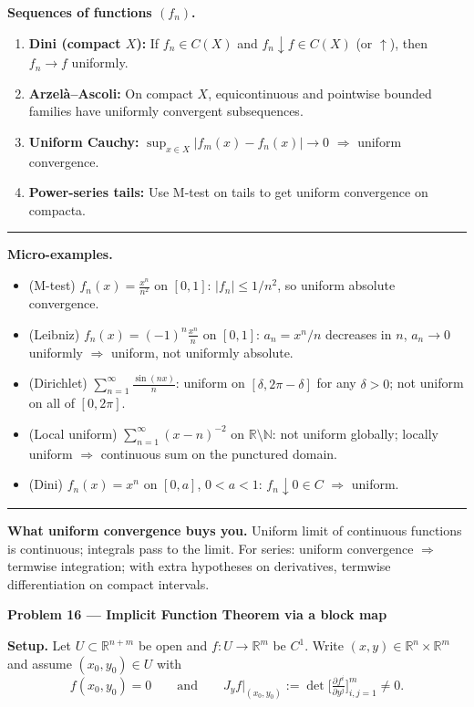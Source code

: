 \documentclass[12pt,a4paper]{article}
\theoremstyle{plain}
\theoremstyle{definition}
\theoremstyle{remark}
\theoremstyle{remark}
\newcommand{\probheader}[1]{%
	\par\vspace{8pt}%
	{\Large\bfseries #1\par}%
	\vspace{6pt}%
}
\newcommand{\sep}{\vspace{6pt}\hrule\vspace{8pt}}
\begin{document}
	\textbf{Sequences of functions $(f_n)$.}
	\begin{enumerate}[leftmargin=1.2cm,label=\arabic*)]
		\item \textbf{Dini (compact $X$):} If $f_n\in C(X)$ and $f_n\downarrow f\in C(X)$ (or $\uparrow$), then $f_n\to f$ uniformly.
		\item \textbf{Arzel\`a--Ascoli:} On compact $X$, equicontinuous and pointwise bounded families have uniformly convergent subsequences.
		\item \textbf{Uniform Cauchy:} $\sup_{x\in X}|f_m(x)-f_n(x)|\to0$ $\Rightarrow$ uniform convergence.
		\item \textbf{Power-series tails:} Use M-test on tails to get uniform convergence on compacta.
	\end{enumerate}
	
	\sep
	
	\textbf{Micro-examples.}
	\begin{itemize}
		\item (M-test) $\displaystyle f_n(x)=\frac{x^n}{n^2}$ on $[0,1]$:
		$|f_n|\le 1/n^2$, so uniform absolute convergence.
		\item (Leibniz) $\displaystyle f_n(x)=(-1)^n\frac{x^n}{n}$ on $[0,1]$:
		$a_n=x^n/n$ decreases in $n$, $a_n\to0$ uniformly $\Rightarrow$ uniform, not uniformly absolute.
		\item (Dirichlet) $\displaystyle \sum_{n=1}^\infty \frac{\sin(nx)}{n}$:
		uniform on $[\delta,2\pi-\delta]$ for any $\delta>0$; not uniform on all of $[0,2\pi]$.
		\item (Local uniform) $\displaystyle \sum_{n=1}^\infty (x-n)^{-2}$ on $\mathbb R\setminus\mathbb N$:
		not uniform globally; locally uniform $\Rightarrow$ continuous sum on the punctured domain.
		\item (Dini) $f_n(x)=x^n$ on $[0,a]$, $0<a<1$: $f_n\downarrow 0\in C$ $\Rightarrow$ uniform.
	\end{itemize}
	
	\sep
	
	\textbf{What uniform convergence buys you.}
	Uniform limit of continuous functions is continuous; integrals pass to the limit.
	For series: uniform convergence $\Rightarrow$ termwise integration; with extra hypotheses on derivatives,
	termwise differentiation on compact intervals.
	
	\probheader{Problem 16 — Implicit Function Theorem via a block map}
	
	\textbf{Setup.}
	Let $U\subset\mathbb{R}^{n+m}$ be open and $f:U\to\mathbb{R}^m$ be $C^1$.
	Write $(x,y)\in\mathbb{R}^n\times\mathbb{R}^m$ and assume $(x_0,y_0)\in U$ with
	\[
	f(x_0,y_0)=0
	\qquad\text{and}\qquad
	J_y f\big|_{(x_0,y_0)}:=\det\!\Big[\tfrac{\partial f^i}{\partial y^j}\Big]_{i,j=1}^m\neq 0.
	\]
	
\end{document}
